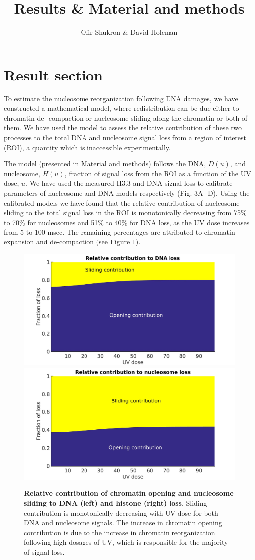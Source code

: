 \documentclass[12pt]{article}
\begin{document}
	
	\title{Results \& Material and methods}
	\author{Ofir Shukron \& David Holcman}
	\maketitle
	
	\section{Result section}
	To estimate the nucleosome reorganization following DNA damages, we have
	constructed a mathematical model, where redistribution can be due either to chromatin de-
	compaction or nucleosome sliding along the chromatin or both of them. We
	have used the model to assess the relative contribution of these two processes
	to the total DNA and nucleosome signal loss from a region of interest (ROI),
	a quantity which is inaccessible experimentally.
	
	The model (presented in Material and methods) follows the DNA, $D(u)$,
	and nucleosome, $H(u)$, fraction of signal loss from the ROI as a function of
	the UV dose, $u$. We have used the measured H3.3 and DNA signal loss to
	calibrate parameters of nucleosome and DNA models respectively (Fig. 3A-
	D). Using the calibrated models we have found that the relative contribution
	of nucleosome sliding to the total signal loss in the ROI is monotonically
	decreasing from 75\% to 70\% for nucleosomes and 51\% to 40\% for DNA loss,
	as the UV dose increases from 5 to 100 msec. The remaining percentages are
	attributed to chromatin expansion and de-compaction (see Figure \ref{fig:relatiiveContributionToLoss}).
	
	\begin{figure}[H]
		\includegraphics[width=0.5\linewidth, height=0.3\textheight]{relatiiveContributionToDNALoss}
		\includegraphics[width=0.5\linewidth, height=0.3\textheight]{relativeContributionToHistoneLoss}
		\caption{\textbf{Relative contribution of chromatin opening and nucleosome sliding to DNA (left) and histone (right) loss}. Sliding contribution is monotonically decreasing with UV dose for both DNA and nucleosome signals. The increase in chromatin opening contribution is due to the increase in chromatin reorganization following high dosages of UV, which is responsible for the majority of signal loss.}
		\label{fig:relatiiveContributionToLoss}
	\end{figure}
	
\end{document}
